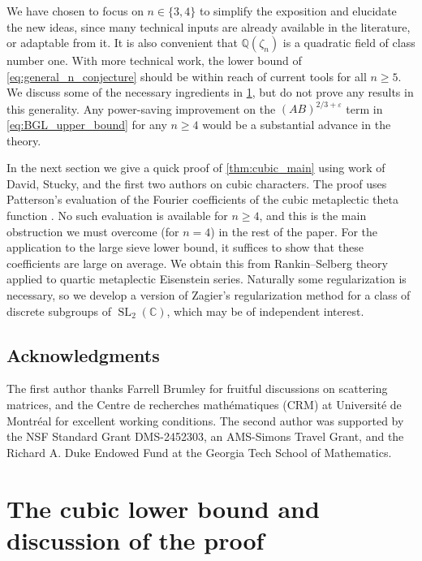 \documentclass[12pt,reqno]{amsart}
\numberwithin{equation}{section}
\newcommand{\Q}{\mathbb{Q}}
\newcommand{\C}{\mathbb{C}}
\DeclareMathOperator{\SL}{SL}
\begin{document}
We have chosen to focus on $n \in \{3, 4\}$ to simplify the exposition and elucidate the new ideas, since many technical inputs are already available in the literature, or adaptable from it. It is also convenient that $\Q(\zeta_n)$ is a quadratic field of class number one. With more technical work, the lower bound of \eqref{eq:general_n_conjecture} should be within reach of current tools for all $n \geq 5$. We discuss some of the necessary ingredients in \cref{sec:cubic}, but do not prove any results in this generality. Any power-saving improvement on the $(AB)^{2/3+\varepsilon}$ term in \eqref{eq:BGL_upper_bound}
for any $n \geq 4$ would be a substantial advance in the theory.

In the next section we give a quick proof of \cref{thm:cubic_main} using work of David, Stucky, and the first two authors \cite{DDDS24} on cubic characters. The proof uses Patterson's evaluation of the Fourier coefficients of the cubic metaplectic theta function \cite{Pat1}. No such evaluation is available for $n\geq 4$, and this is the main obstruction we must overcome (for $n = 4$) in the rest of the paper. For the application to the large sieve lower bound, it suffices to show that these coefficients are large on average. We obtain this from Rankin--Selberg theory applied to quartic metaplectic Eisenstein series. Naturally some regularization is necessary, so we develop a version of Zagier's regularization method \cite{Zag} for a class of discrete subgroups of $\SL_2(\C)$, which may be of independent interest.

\subsection*{Acknowledgments}
The first author thanks Farrell Brumley for fruitful discussions on scattering matrices, and the Centre de recherches math{\'e}matiques (CRM) at Universit{\'e} de Montr{\'e}al for excellent working conditions.
The second author was supported by the NSF
Standard Grant DMS-2452303, an AMS-Simons Travel Grant, and the Richard A. Duke
Endowed Fund at the Georgia Tech School of Mathematics.


\section{The cubic lower bound and discussion of the proof} \label{sec:cubic}
\end{document}
